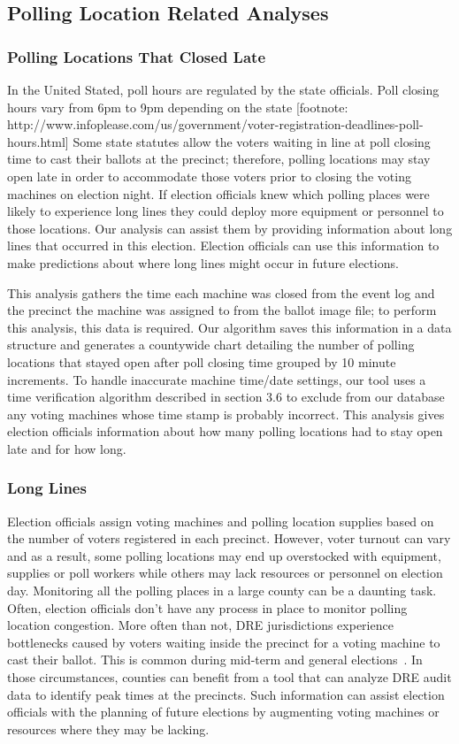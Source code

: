 \subsection{Polling Location Related Analyses}
\subsubsection{Polling Locations That Closed Late}
In the United Stated, poll hours are regulated by the state officials. Poll closing hours vary from 6pm to 9pm depending on the state [footnote: http://www.infoplease.com/us/government/voter-registration-deadlines-poll-hours.html] Some state statutes allow the voters waiting in line at poll closing time to cast their ballots at the precinct; therefore,  polling locations may stay open late in order to accommodate those voters prior to closing the voting machines on election night. If election officials knew which polling places were likely to experience long lines they could deploy more equipment or personnel to those locations. Our analysis can assist them by providing information about long lines that occurred in this election. Election officials can use this information to make predictions about where long lines might occur in future elections.

This analysis gathers the time each machine was closed from the event log and the precinct the machine was assigned to from the ballot image file; to perform this analysis, this data is required.  Our algorithm saves this information in a data structure and generates a countywide chart detailing the number of polling locations that stayed open after poll closing time grouped by 10 minute increments. To handle inaccurate machine time/date settings, our tool uses a time verification algorithm described in section 3.6 to exclude from our database any voting machines whose time stamp is probably incorrect. This analysis gives election officials information about how many polling locations had to stay open late and for how long.

\subsubsection{Long Lines}
Election officials assign voting machines and polling location supplies based on the number of voters registered in each precinct.  However, voter turnout can vary and as a result, some polling locations may end up overstocked with equipment, supplies or poll workers while others may lack resources or personnel on election day. Monitoring all the polling places in a large county can be a daunting task. Often, election officials don't have any process in place to monitor polling location congestion. More often than not, DRE jurisdictions experience bottlenecks caused by voters waiting inside the precinct for a voting machine to cast their ballot. This is common during mid-term and general elections~\cite{Kreitman2010, Slade2008, U2010}.  In those circumstances, counties can benefit from a tool that can analyze DRE audit data to identify peak times at the precincts. Such information can assist election officials with the planning of future elections by augmenting voting machines or resources where they may be lacking.

